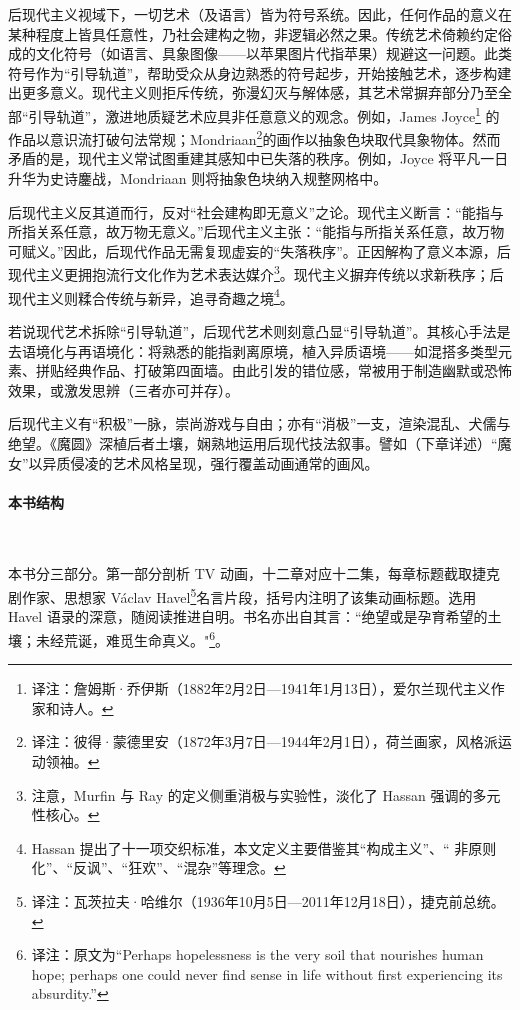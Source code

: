 后现代主义视域下，一切艺术（及语言）皆为符号系统。因此，任何作品的意义在某种程度上皆具任意性，乃社会建构之物，非逻辑必然之果。传统艺术倚赖约定俗成的文化符号（如语言、具象图像——以苹果图片代指苹果）规避这一问题。此类符号作为“引导轨道”，帮助受众从身边熟悉的符号起步，开始接触艺术，逐步构建出更多意义。现代主义则拒斥传统，弥漫幻灭与解体感，其艺术常摒弃部分乃至全部“引导轨道”，激进地质疑艺术应具非任意意义的观念。例如，James Joyce\footnote{译注：詹姆斯·乔伊斯（1882年2月2日—1941年1月13日），爱尔兰现代主义作家和诗人。} 的作品以意识流打破句法常规；Mondriaan\footnote{译注：彼得·蒙德里安（1872年3月7日—1944年2月1日），荷兰画家，风格派运动领袖。}的画作以抽象色块取代具象物体。然而矛盾的是，现代主义常试图重建其感知中已失落的秩序\cite{ref3}。例如，Joyce 将平凡一日升华为史诗鏖战，Mondriaan 则将抽象色块纳入规整网格中。

后现代主义反其道而行，反对“社会建构即无意义”之论。现代主义断言：“能指与所指关系任意，故万物无意义。”后现代主义主张：“能指与所指关系任意，故万物可赋义。”因此，后现代作品无需复现虚妄的“失落秩序”。正因解构了意义本源，后现代主义更拥抱流行文化作为艺术表达媒介\footnote{注意，Murfin 与 Ray 的定义侧重消极与实验性，淡化了 Hassan 强调的多元性核心。}\cite{ref4}。现代主义摒弃传统以求新秩序；后现代主义则糅合传统与新异，追寻奇趣之境\footnote{Hassan 提出了十一项交织标准，本文定义主要借鉴其“构成主义”、“ 非原则化”、“反讽”、“狂欢”、“混杂”等理念。}\cite{ref5}。

若说现代艺术拆除“引导轨道”，后现代艺术则刻意凸显“引导轨道”。其核心手法是去语境化与再语境化：将熟悉的能指剥离原境，植入异质语境——如混搭多类型元素、拼贴经典作品、打破第四面墙\cite{ref5}。由此引发的错位感，常被用于制造幽默或恐怖效果，或激发思辨（三者亦可并存）。

后现代主义有“积极”一脉，崇尚游戏与自由；亦有“消极”一支，渲染混乱、犬儒与绝望\cite{ref6}。《魔圆》深植后者土壤，娴熟地运用后现代技法叙事。譬如（下章详述）“魔女”以异质侵凌的艺术风格呈现，强行覆盖动画通常的画风。
\paragraph{本书结构}~{}

本书分三部分。第一部分剖析 TV 动画，十二章对应十二集，每章标题截取捷克剧作家、思想家 Václav Havel\footnote{译注：瓦茨拉夫·哈维尔（1936年10月5日—2011年12月18日），捷克前总统。}名言片段，括号内注明了该集动画标题。选用 Havel 语录的深意，随阅读推进自明。书名亦出自其言：``绝望或是孕育希望的土壤；未经荒诞，难觅生命真义。"\footnote{译注：原文为``Perhaps hopelessness is the very soil that nourishes human hope; perhaps one could never find sense in life without first experiencing its absurdity.'' }\cite{ref7}。

